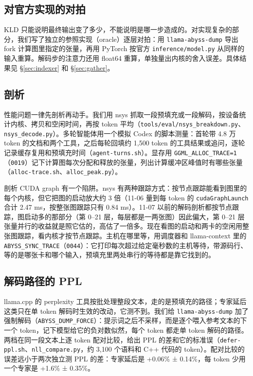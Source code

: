 \documentclass[11pt,a4paper]{article}
\newcommand{\code}[1]{\texttt{#1}}
\begin{document}
\subsection{对官方实现的对拍}

KLD 只能说明最终输出变了多少，不能说明是哪一步造成的。对实现复杂的部分，我们写了独立的参照实现（oracle）逐层对拍：用 \code{llama-abyss-dump} 导出 fork 计算图里指定的张量，再用 PyTorch 按官方 \code{inference/model.py} 从同样的输入重算。解码步的注意力还用 float64 重算，单独量出内核的舍入误差。具体结果见 \S\ref{sec:indexer} 和 \S\ref{sec:gather}。

\subsection{剖析}
\label{sec:profiling}

性能问题一律先剖析再动手。我们用 nsys 抓取一段预填充或一段解码，按设备统计内核、拷贝和空闲时间，再按 token 平均（\code{tools/eval/nsys\_breakdown.py}、\code{nsys\_decode.py}）。多轮智能体用一个模拟 Codex 的脚本测量：首轮带 4.8 万 token 的文档和两个工具，之后每轮回填约 1,500 token 的工具结果或追问，逐轮记录缓存复用和预填充时间（\code{agent-turns.sh}）。显存用 \code{GGML\_ALLOC\_TRACE=1}（\code{0019}）记下计算图每次分配和释放的张量，列出计算缓冲区峰值时有哪些张量（\code{alloc-trace.sh}、\code{alloc\_peak.py}）。

剖析 CUDA graph 有一个陷阱。nsys 有两种跟踪方式：按节点跟踪能看到图里的每个内核，但它把图的启动放大约 3 倍（11-06 量到每 token 的 \code{cudaGraphLaunch} 合计 2.47 ms，按整张图跟踪只有 0.84 ms）。11-07 以前的解码剖析都按节点跟踪，图启动多的那部分（第 0--21 层，每层都是一两张图）因此偏大，第 0--21 层张量并行的收益就是照它估的，高估了一倍多。现在看图的启动和两卡的空闲用整张图跟踪，看内核才按节点跟踪。主机在哪里等，用调度器和 llama-context 里的 \code{ABYSS\_SYNC\_TRACE}（\code{0044}）：它打印每次超过给定毫秒数的主机等待，带源码行、等的是哪张卡和哪个输入，预填充里两处串行的等待都是靠它找到的。

\subsection{解码路径的 PPL}
\label{sec:forcedppl}

llama.cpp 的 perplexity 工具按批处理整段文本，走的是预填充的路径；专家延后这类只在单 token 解码时生效的改动，它测不到。我们给 \code{llama-abyss-dump} 加了强制解码（\code{ABYSS\_DUMP\_FORCE}）：提示词之后不采样，而是逐个喂入参考文本的下一个 token，记下模型给它的负对数似然，每个 token 都走单 token 解码的路径。两档在同一段文本上逐 token 配对比较，给出 PPL 的差和它的标准误（\code{defer-ppl.sh}、\code{nll\_compare.py}，约 3,100 个语料和 C++ 代码的 token）。配对比较的误差远小于两次独立测 PPL 的差：专家延后是 +0.06\% ± 0.14\%，每 token 少用一个专家是 +1.6\% ± 0.35\%。
\end{document}
